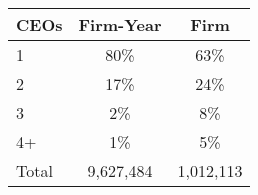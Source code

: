 \begin{tabular}{lcc}
\toprule
CEOs & Firm-Year & Firm \\
\midrule
1 & 80\% & 63\% \\
2 & 17\% & 24\% \\
3 & 2\% & 8\% \\
4+ & 1\% & 5\% \\
Total &    9,627,484 &    1,012,113 \\
\bottomrule
\end{tabular}
